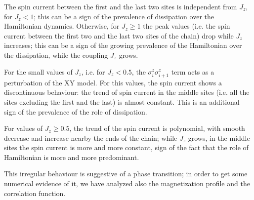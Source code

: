 The spin current between the first and the last two sites is independent from $J_z$, for $J_z < 1$; this can be a sign of the prevalence of dissipation over the Hamiltonian dynamics. Otherwise, for $J_z \geq 1$ the peak values (i.e. the spin current between the first two and the last two sites of the chain) drop while $J_z$ increases; this can be a sign of the growing prevalence of the Hamiltonian over the dissipation, while the coupling $J_z$ grows.

For the small values of $J_z$, i.e. for $J_z < 0.5$, the $\sigma_i^z\sigma_{i+1}^z$ term acts as a perturbation of the XY model. For this values, the spin current shows a discontinuous behaviour: the trend of spin current in the middle sites (i.e. all the sites excluding the first and the last) is almost constant. This is an additional sign of the prevalence of the role of dissipation.

For values of $J_z \geq 0.5$, the trend of the spin current is polynomial, with smooth decrease and increase nearby the ends of the chain; while $J_z$ grows, in the middle sites the spin current is more and more constant, sign of the fact that the role of Hamiltonian is more and more predominant. 

This irregular behaviour is suggestive of a phase transition; in order to get some numerical evidence of it, we have analyzed also the magnetization profile and the correlation function.




